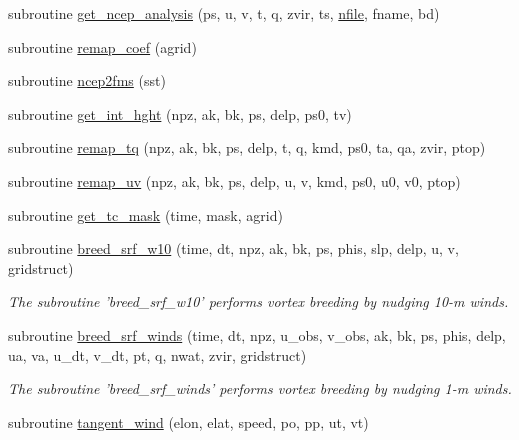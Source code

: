\begin{DoxyCompactItemize}
\item 
subroutine \hyperlink{classfv__nwp__nudge__mod_ae2d3d00098cdab3691b6b7775a8f24ea}{get\-\_\-ncep\-\_\-analysis} (ps, u, v, t, q, zvir, ts, \hyperlink{classfv__nwp__nudge__mod_ac3f13e9bca31d7209fb652c08f3f50b8}{nfile}, fname, bd)
\item 
subroutine \hyperlink{classfv__nwp__nudge__mod_a459cebfc9aab25ccab52cef29c0da7d2}{remap\-\_\-coef} (agrid)
\item 
subroutine \hyperlink{classfv__nwp__nudge__mod_a0ff11151a5061fd4ddcdc4fee37da618}{ncep2fms} (sst)
\item 
subroutine \hyperlink{classfv__nwp__nudge__mod_a86bfb2f217d34d2927ce61a8ee8ea30a}{get\-\_\-int\-\_\-hght} (npz, ak, bk, ps, delp, ps0, tv)
\item 
subroutine \hyperlink{classfv__nwp__nudge__mod_a58249db452c718ac39ba534e7e2e75e6}{remap\-\_\-tq} (npz, ak, bk, ps, delp, t, q, kmd, ps0, ta, qa, zvir, ptop)
\item 
subroutine \hyperlink{classfv__nwp__nudge__mod_a1404c8483c8c5679474c17f84173f666}{remap\-\_\-uv} (npz, ak, bk, ps, delp, u, v, kmd, ps0, u0, v0, ptop)
\item 
subroutine \hyperlink{classfv__nwp__nudge__mod_ae1f75580d900fde7f16d0ea4c04dda0d}{get\-\_\-tc\-\_\-mask} (time, mask, agrid)
\item 
subroutine \hyperlink{classfv__nwp__nudge__mod_a7b916a894092000ca2773bbaf63fad25}{breed\-\_\-srf\-\_\-w10} (time, dt, npz, ak, bk, ps, phis, slp, delp, u, v, gridstruct)
\begin{DoxyCompactList}\small\item\em The subroutine 'breed\-\_\-srf\-\_\-w10' performs vortex breeding by nudging 10-\/m winds. \end{DoxyCompactList}\item 
subroutine \hyperlink{classfv__nwp__nudge__mod_a6615fa560c7d4186d2c6da06aecbb5d1}{breed\-\_\-srf\-\_\-winds} (time, dt, npz, u\-\_\-obs, v\-\_\-obs, ak, bk, ps, phis, delp, ua, va, u\-\_\-dt, v\-\_\-dt, pt, q, nwat, zvir, gridstruct)
\begin{DoxyCompactList}\small\item\em The subroutine 'breed\-\_\-srf\-\_\-winds' performs vortex breeding by nudging 1-\/m winds. \end{DoxyCompactList}\item 
subroutine \hyperlink{classfv__nwp__nudge__mod_aefc113f26f725814456ee4d0e2094e46}{tangent\-\_\-wind} (elon, elat, speed, po, pp, ut, vt)
\item 

\end{DoxyCompactItemize}
